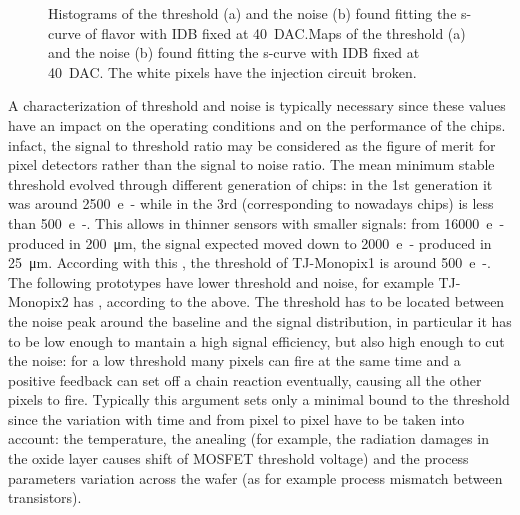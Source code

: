 \begin{figure}[h!]
            \label{fig:threshold_noise_hist}
            \caption{Histograms of the threshold (a) and the noise (b) found fitting the s-curve of  flavor with IDB fixed at \SI{40}{DAC}.Maps of the threshold (a) and the noise (b) found fitting the s-curve with IDB fixed at \SI{40}{DAC}. The white pixels have the injection circuit broken. }
        \end{figure}            
           
        A characterization of threshold and noise is typically necessary since these values have an impact on the operating conditions and on the performance of the chips. 
        infact, the signal to threshold ratio may be considered as the figure of merit for pixel detectors rather than the signal to noise ratio.
        The mean minimum stable threshold evolved through different generation of chips: in the 1st generation it was around \SI{2500}{e-} while in the 3rd (corresponding to nowadays chips) is less than \SI{500}{e-}. This allows in thinner sensors with smaller signals: from \SI{16000}{e-} produced in \SI{200}{\um}, the signal expected moved down to \SI{2000}{e-} produced in \SI{25}{\um}. According with this , the threshold of TJ-Monopix1 is around \SI{500}{e-}.
        The following prototypes have lower threshold and noise, for example TJ-Monopix2 has , according to the above.
        The threshold has to be located between the noise peak around the baseline and the signal distribution, in particular it has to be low enough to mantain a high signal efficiency, but also high enough to cut the noise: for a low threshold many pixels can fire at the same time and a positive feedback can set off a chain reaction eventually, causing all the other pixels to fire.
        Typically this argument sets only a minimal bound to the threshold since the variation with time and from pixel to pixel have to be taken into account: the temperature, the anealing (for example, the radiation damages in the oxide layer causes shift of MOSFET threshold voltage) and the process parameters variation across the wafer (as for example process mismatch between transistors). 
        
